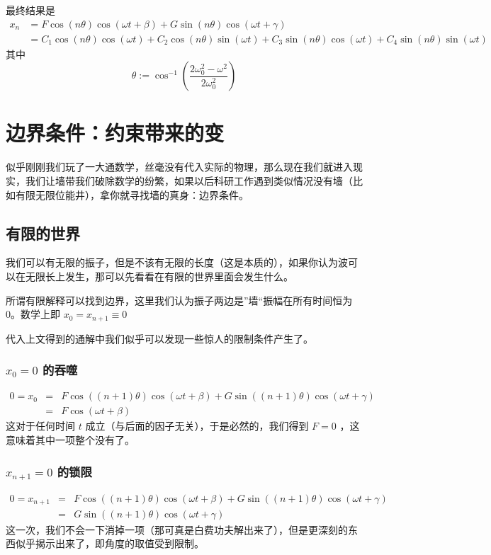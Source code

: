 \documentclass[11pt]{book}
\begin{document}
最终结果是
\begin{equation}
\label{eq:24}
\begin{split}
x_n & =  F\cos(n\theta)\cos(\omega t+\beta)+G\sin(n\theta)\cos(\omega t+\gamma) \\
& =  C_1\cos(n\theta)\cos(\omega t)+C_2\cos(n\theta)\sin(\omega t)
+C_3\sin(n\theta)\cos(\omega t)+C_4\sin(n\theta)\sin(\omega t)
\end{split}
\end{equation}
其中
\begin{equation}
\label{eq:thetaDef}
\theta:=\cos^{-1}(\frac{2\omega^2_0-\omega^2}{2\omega^2_0})
\end{equation}

\section{边界条件：约束带来的变}
\label{sec:org141cf26}
似乎刚刚我们玩了一大通数学，丝毫没有代入实际的物理，那么现在我们就进入现实，我们让墙带我们破除数学的纷繁，如果以后科研工作遇到类似情况没有墙（比如有限无限位能井），拿你就寻找墙的真身：边界条件。
\subsection{有限的世界}
\label{sec:org53f1ae6}
我们可以有无限的振子，但是不该有无限的长度（这是本质的），如果你认为波可以在无限长上发生，那可以先看看在有限的世界里面会发生什么。

所谓有限解释可以找到边界，这里我们认为振子两边是”墙“振幅在所有时间恒为0。数学上即 \(x_0=x_{n+1}\equiv0\)

代入上文得到的通解中我们似乎可以发现一些惊人的限制条件产生了。
\subsubsection{\(x_0=0\) 的吞噬}
\label{sec:org98cda01}
\begin{eqnarray*}
\label{eq:30}
0=x_{0} & = &F\cos((n+1)\theta)\cos(\omega t+\beta)+G\sin((n+1)\theta)\cos(\omega t+\gamma)  \\
&=& F\cos(\omega t+\beta)
\end{eqnarray*}
这对于任何时间 \(t\) 成立（与后面的因子无关），于是必然的，我们得到 \(F=0\) ，这意味着其中一项整个没有了。

\subsubsection{\(x_{n+1}=0\) 的锁限}
\label{sec:orgc2c2c3d}
\begin{eqnarray*}
\label{eq:31}
0=x_{n+1} & = &F\cos((n+1)\theta)\cos(\omega t+\beta)+G\sin((n+1)\theta)\cos(\omega t+\gamma)  \\
&=& G\sin((n+1)\theta)\cos(\omega t+\gamma)
\end{eqnarray*}
这一次，我们不会一下消掉一项（那可真是白费功夫解出来了），但是更深刻的东西似乎揭示出来了，即角度的取值受到限制。
\end{document}
